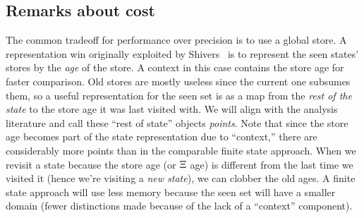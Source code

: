 \subsection{Remarks about cost}

The common tradeoff for performance over precision is to use a global store.
%
A representation win originally exploited by Shivers~\citep{ianjohnson:Shivers:1991:CFA} is to represent the seen states' stores by the \emph{age} of the store.
%
A context in this case contains the store age for faster comparison.
%
Old stores are mostly useless since the current one subsumes them, so a useful representation for the seen set is as a map from the \emph{rest of the state} to the store age it was last visited with.
%
We will align with the analysis literature and call these ``rest of state'' objects \emph{points}.
%
Note that since the store age becomes part of the state representation due to ``context,'' there are considerably more points than in the comparable finite state approach.
%
When we revisit a state because the store age (or $\Xi$ age) is different from the last time we visited it (hence we're visiting a \emph{new state}), we can clobber the old ages.
%
A finite state approach will use less memory because the seen set will have a smaller domain (fewer distinctions made because of the lack of a ``context'' component).
%
%
